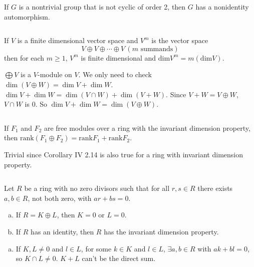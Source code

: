 $$ $$

\begin{ex}
    If $G$ is a nontrivial group that is not cyclic of order 2, then $G$ has a nonidentity automorphism.
\end{ex}

$$ $$

\begin{ex}
    If $V$ is a finite dimensional vector space and $V^{m}$ is the vector space\[V\oplus V\oplus\cdots\oplus V \,(m \text{ summands})\] then for each $m\geq 1$, $V^{m}$ is finite dimensional and $\mathrm{dim} V^{m}=m(\mathrm{dim}V)$.
\end{ex}

\begin{answer}
    $\bigoplus V$ is a $V$-module on $V$. We only need to check $\dim(V\oplus W)=\dim V+\dim W$. $\dim V+\dim W=\dim(V\cap W)+\dim (V+W)$. Since $V+W=V\oplus W$, $V\cap W$ is $0$. So $\dim V+\dim W=\dim(V\oplus W)$.
\end{answer}

$$ $$

\begin{ex}
    If $F_{1}$ and $F_{2}$ are free modules over a ring with the invariant dimension property, then $\mathrm{rank}(F_{1}\oplus F_{2})=\mathrm{rank}F_{1}+\mathrm{rank}F_{2}$.
\end{ex}

\begin{answer}
    Trivial since Corollary IV 2.14 is also true for a ring with invariant dimension property. 
\end{answer}

$$ $$

\begin{ex}
    Let $R$ be a ring with no zero divisors such that for all $r,s\in R$ there exists $a,b\in R$, not both zero, with $ar+bs=0$.
    \begin{enumerate}[(a)]
        \item If $R=K\oplus L$, then $K=0$ or $L=0$.
        \item If $R$ has an identity, then $R$ has the invariant dimension property.
    \end{enumerate}
\end{ex}

\begin{answer}
    \begin{enumerate}[(a)]
        \item If $K,L\neq 0$ and $l\in L$, for some $k\in K$ and $l\in L$, $\exists a,b\in R$ with $ak+bl=0$, so $K\cap L\neq 0$. $K+L$ can't be the direct sum.
    \end{enumerate}
\end{answer}

